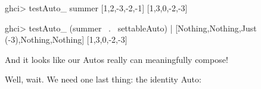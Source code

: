 \documentclass[]{article}
\newenvironment{Shaded}{}{}
\newcommand{\DataTypeTok}[1]{\textcolor[rgb]{0.56,0.13,0.00}{{#1}}}
\newcommand{\DecValTok}[1]{\textcolor[rgb]{0.25,0.63,0.44}{{#1}}}
\newcommand{\CommentTok}[1]{\textcolor[rgb]{0.38,0.63,0.69}{\textit{{#1}}}}
\newcommand{\OtherTok}[1]{\textcolor[rgb]{0.00,0.44,0.13}{{#1}}}
\newcommand{\FunctionTok}[1]{\textcolor[rgb]{0.02,0.16,0.49}{{#1}}}
\newcommand{\NormalTok}[1]{{#1}}
\begin{document}
\begin{Shaded}
\begin{Highlighting}[]
\NormalTok{ghci}\FunctionTok{>} \NormalTok{testAuto_ summer [}\DecValTok{1}\NormalTok{,}\DecValTok{2}\NormalTok{,}\FunctionTok{-}\DecValTok{3}\NormalTok{,}\FunctionTok{-}\DecValTok{2}\NormalTok{,}\FunctionTok{-}\DecValTok{1}\NormalTok{]}
\NormalTok{[}\DecValTok{1}\NormalTok{,}\DecValTok{3}\NormalTok{,}\DecValTok{0}\NormalTok{,}\FunctionTok{-}\DecValTok{2}\NormalTok{,}\FunctionTok{-}\DecValTok{3}\NormalTok{]}

\NormalTok{ghci}\FunctionTok{>} \NormalTok{testAuto_ (summer }\FunctionTok{~.~} \NormalTok{settableAuto)}
    \FunctionTok{|}     \NormalTok{[}\DataTypeTok{Nothing}\NormalTok{,}\DataTypeTok{Nothing}\NormalTok{,}\DataTypeTok{Just} \NormalTok{(}\FunctionTok{-}\DecValTok{3}\NormalTok{),}\DataTypeTok{Nothing}\NormalTok{,}\DataTypeTok{Nothing}\NormalTok{]}
\NormalTok{[}\DecValTok{1}\NormalTok{,}\DecValTok{3}\NormalTok{,}\DecValTok{0}\NormalTok{,}\FunctionTok{-}\DecValTok{2}\NormalTok{,}\FunctionTok{-}\DecValTok{3}\NormalTok{]}
\end{Highlighting}
\end{Shaded}

And it looks like our Autos really can meaningfully compose!

Well, wait. We need one last thing: the identity Auto:

\begin{Shaded}
\end{Shaded}
\end{document}
